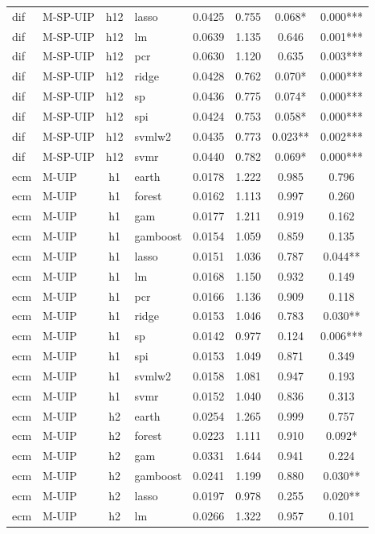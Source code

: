 \begin{ThreePartTable}
\begin{longtable}[t]{llclcccc}
dif & M-SP-UIP & h12 & lasso & 0.0425 & 0.755 & 0.068* & 0.000***\\
dif & M-SP-UIP & h12 & lm & 0.0639 & 1.135 & 0.646 & 0.001***\\
dif & M-SP-UIP & h12 & pcr & 0.0630 & 1.120 & 0.635 & 0.003***\\
dif & M-SP-UIP & h12 & ridge & 0.0428 & 0.762 & 0.070* & 0.000***\\
dif & M-SP-UIP & h12 & sp & 0.0436 & 0.775 & 0.074* & 0.000***\\
dif & M-SP-UIP & h12 & spi & 0.0424 & 0.753 & 0.058* & 0.000***\\
dif & M-SP-UIP & h12 & svmlw2 & 0.0435 & 0.773 & 0.023** & 0.002***\\
dif & M-SP-UIP & h12 & svmr & 0.0440 & 0.782 & 0.069* & 0.000***\\
\addlinespace
ecm & M-UIP & h1 & earth & 0.0178 & 1.222 & 0.985 & 0.796\\
ecm & M-UIP & h1 & forest & 0.0162 & 1.113 & 0.997 & 0.260\\
ecm & M-UIP & h1 & gam & 0.0177 & 1.211 & 0.919 & 0.162\\
ecm & M-UIP & h1 & gamboost & 0.0154 & 1.059 & 0.859 & 0.135\\
ecm & M-UIP & h1 & lasso & 0.0151 & 1.036 & 0.787 & 0.044**\\
ecm & M-UIP & h1 & lm & 0.0168 & 1.150 & 0.932 & 0.149\\
ecm & M-UIP & h1 & pcr & 0.0166 & 1.136 & 0.909 & 0.118\\
ecm & M-UIP & h1 & ridge & 0.0153 & 1.046 & 0.783 & 0.030**\\
ecm & M-UIP & h1 & sp & 0.0142 & 0.977 & 0.124 & 0.006***\\
ecm & M-UIP & h1 & spi & 0.0153 & 1.049 & 0.871 & 0.349\\
ecm & M-UIP & h1 & svmlw2 & 0.0158 & 1.081 & 0.947 & 0.193\\
ecm & M-UIP & h1 & svmr & 0.0152 & 1.040 & 0.836 & 0.313\\
\addlinespace
ecm & M-UIP & h2 & earth & 0.0254 & 1.265 & 0.999 & 0.757\\
ecm & M-UIP & h2 & forest & 0.0223 & 1.111 & 0.910 & 0.092*\\
ecm & M-UIP & h2 & gam & 0.0331 & 1.644 & 0.941 & 0.224\\
ecm & M-UIP & h2 & gamboost & 0.0241 & 1.199 & 0.880 & 0.030**\\
ecm & M-UIP & h2 & lasso & 0.0197 & 0.978 & 0.255 & 0.020**\\
ecm & M-UIP & h2 & lm & 0.0266 & 1.322 & 0.957 & 0.101\\

\end{longtable}
\end{ThreePartTable}
